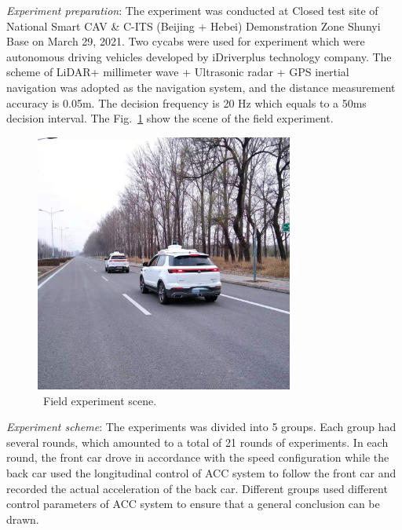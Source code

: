 \documentclass[journal]{IEEEtran}
\begin{document}
\textit{Experiment preparation}: The experiment was conducted at Closed test site of National Smart CAV \& C-ITS (Beijing + Hebei) Demonstration Zone Shunyi Base on March 29, 2021. Two cycabs were used for experiment which were autonomous driving vehicles developed by iDriverplus technology company. The scheme of LiDAR+ millimeter wave + Ultrasonic radar + GPS inertial navigation was adopted as the navigation system, and the distance measurement accuracy is 0.05m. The decision frequency is 20 Hz which equals to a 50ms decision interval. The Fig.~\ref{experiment} show the scene of the field experiment.

\begin{figure}
  \centering
  \includegraphics[width=8.5cm]{figs/experiment.jpg}
  \caption{~Field experiment scene.}
  \label{experiment}
\end{figure}

\textit{Experiment scheme}: The experiments was divided into 5 groups. Each group had several rounds, which amounted to a total of 21 rounds of experiments. In each round, the front car drove in accordance with the speed configuration while the back car used the longitudinal control of ACC system to follow the front car and recorded the actual acceleration of the back car. Different groups used different control parameters of ACC system to ensure that a general conclusion can be drawn.
\end{document}
